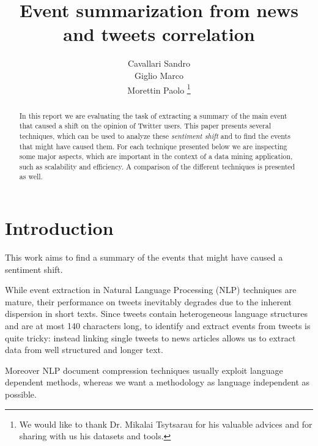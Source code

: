 \documentclass{acm_proc_article-sp-sigmod07}
\begin{document}
\title{Event summarization from news and tweets correlation}
\author{Cavallari Sandro\\Giglio Marco\\Morettin Paolo
\thanks{We would like to thank Dr. Mikalai Tsytsarau for his valuable advices and for sharing with us his datasets and tools.}}

%
\maketitle
\begin{abstract}
In this report we are evaluating the task of extracting a summary of the main event that caused a shift on the opinion of Twitter users. 
This paper presents several techniques, which can be used to analyze these \emph{sentiment shift} and to find the events that might have caused them.
For each technique presented below we are inspecting some major aspects, which are important in the context of a data mining application, such as scalability and efficiency.
 A comparison of the different techniques is presented as well.
 \end{abstract}   

\section{Introduction}
This work aims to find a summary of the events that might have caused a sentiment shift.

While event extraction in Natural Language Processing (NLP) techniques are mature, their performance on tweets inevitably degrades due to the inherent dispersion in short texts. Since tweets contain heterogeneous language structures and are at most 140 characters long, to identify and extract events from tweets is quite tricky: instead linking single tweets to news articles allows us to extract data from well structured and longer text.



Moreover NLP document compression techniques usually exploit language dependent methods, whereas we want a methodology as language independent as possible.
\end{document}
